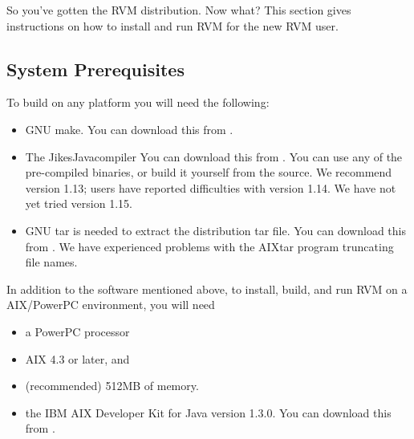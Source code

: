 So you've gotten the RVM distribution.  Now what?  This section gives
instructions on how to install and run RVM for the new RVM user.

\subsection{System Prerequisites}
To build on any platform you will need the following:
\begin{itemize}
\item GNU make. You can download this from
\xlink{{\tt \gnuMakeURL}} {\gnuMakeURL}.

\item The Jikes\trademark Java\trademark compiler 
You can download this from
\xlink{{\tt \jikesURL}} {\jikesURL}.
You can use any of the pre-compiled binaries, or build it yourself from the
source. We recommend version 1.13; users have reported difficulties with 
version 1.14.  We have not yet tried version 1.15.

\item GNU tar is needed to extract the distribution tar file.  
You can download this from
\xlink{{\tt \gnuTarURL}} {\gnuTarURL}.
We have
experienced problems with the AIX\AIXTMFootnote tar program truncating file names.

\end{itemize}


In addition to the software mentioned above, to install, build, and
run RVM on a AIX/PowerPC environment, 
you will need 
\begin{itemize}
\item a PowerPC processor
\item AIX 4.3 or later, and
\item (recommended) 512MB of memory.
\item the IBM AIX Developer Kit for Java version 1.3.0.  You can download this from
\xlink{{\tt \AIXJdkURL}} {\AIXJdkURL}.
\end{itemize}


